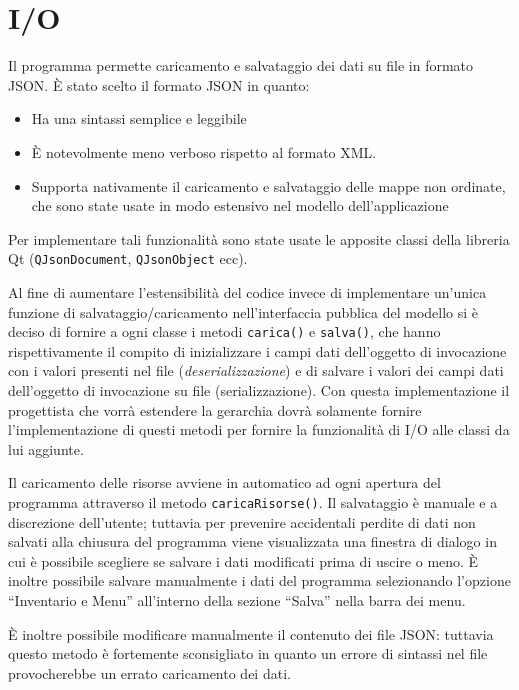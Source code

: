 \documentclass[
  10pt,
]{article}
\providecommand{\tightlist}{%
  \setlength{\itemsep}{0pt}\setlength{\parskip}{0pt}}
\begin{document}
\hypertarget{io}{%
\section{I/O}\label{io}}

Il programma permette caricamento e salvataggio dei dati su file in
formato JSON. È stato scelto il formato JSON in quanto:

\begin{itemize}
\tightlist
\item
  Ha una sintassi semplice e leggibile
\item
  È notevolmente meno verboso rispetto al formato XML.
\item
  Supporta nativamente il caricamento e salvataggio delle mappe non
  ordinate, che sono state usate in modo estensivo nel modello
  dell'applicazione
\end{itemize}

Per implementare tali funzionalità sono state usate le apposite classi
della libreria Qt (\texttt{QJsonDocument}, \texttt{QJsonObject} ecc).

Al fine di aumentare l'estensibilità del codice invece di implementare
un'unica funzione di salvataggio/caricamento nell'interfaccia pubblica
del modello si è deciso di fornire a ogni classe i metodi
\texttt{carica()} e \texttt{salva()}, che hanno rispettivamente il
compito di inizializzare i campi dati dell'oggetto di invocazione con i
valori presenti nel file (\emph{deserializzazione}) e di salvare i
valori dei campi dati dell'oggetto di invocazione su file
(serializzazione). Con questa implementazione il progettista che vorrà
estendere la gerarchia dovrà solamente fornire l'implementazione di
questi metodi per fornire la funzionalità di I/O alle classi da lui
aggiunte.

Il caricamento delle risorse avviene in automatico ad ogni apertura del
programma attraverso il metodo \texttt{caricaRisorse()}. Il salvataggio
è manuale e a discrezione dell'utente; tuttavia per prevenire
accidentali perdite di dati non salvati alla chiusura del programma
viene visualizzata una finestra di dialogo in cui è possibile scegliere
se salvare i dati modificati prima di uscire o meno. È inoltre possibile
salvare manualmente i dati del programma selezionando l'opzione
``Inventario e Menu'' all'interno della sezione ``Salva'' nella barra
dei menu.

È inoltre possibile modificare manualmente il contenuto dei file JSON:
tuttavia questo metodo è fortemente sconsigliato in quanto un errore di
sintassi nel file provocherebbe un errato caricamento dei dati.
\end{document}
